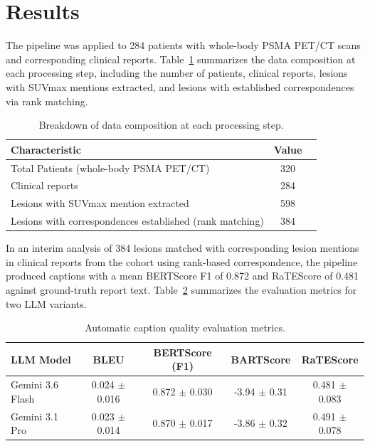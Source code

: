 \documentclass[10pt]{article}
\begin{document}
\section*{Results}
The pipeline was applied to 284 patients with whole-body PSMA PET/CT scans and corresponding clinical reports. Table~\ref{tab:data-composition} summarizes the data composition at each processing step, including the number of patients, clinical reports, lesions with SUVmax mentions extracted, and lesions with established correspondences via rank matching.


\begin{table}[h]
\centering
\caption{Breakdown of data composition at each processing step.}
\label{tab:data-composition}
\begin{tabular}{lcc}
\toprule
Characteristic & Value \\
\midrule
Total Patients (whole-body PSMA PET/CT) & 320 \\
Clinical reports & 284 \\
Lesions with SUVmax mention extracted & 598 \\
Lesions with correspondences established (rank matching) & 384 \\
\bottomrule
\end{tabular}
\end{table}


\smallskip


In an interim analysis of 384 lesions matched with corresponding lesion mentions in clinical reports from the cohort using rank-based correspondence, the pipeline produced captions with a mean BERTScore F1 of 0.872 and RaTEScore of 0.481 against ground-truth report text. Table~\ref{tab:eval-metrics} summarizes the evaluation metrics for two LLM variants. 


\begin{table}[h]
\centering
\begin{tabular}{lcccc}
\toprule
LLM Model & BLEU & BERTScore (F1) & BARTScore & RaTEScore \\
\midrule
Gemini 3.6 Flash & 0.024 $\pm$ 0.016 & 0.872 $\pm$ 0.030 & -3.94 $\pm$ 0.31 & 0.481 $\pm$ 0.083 \\
Gemini 3.1 Pro & 0.023 $\pm$ 0.014 & 0.870 $\pm$ 0.017  & -3.86 $\pm$ 0.32 & 0.491 $\pm$ 0.078 \\
\bottomrule
\end{tabular}
\caption{Automatic caption quality evaluation metrics.}
\label{tab:eval-metrics}
\end{table}
\end{document}
